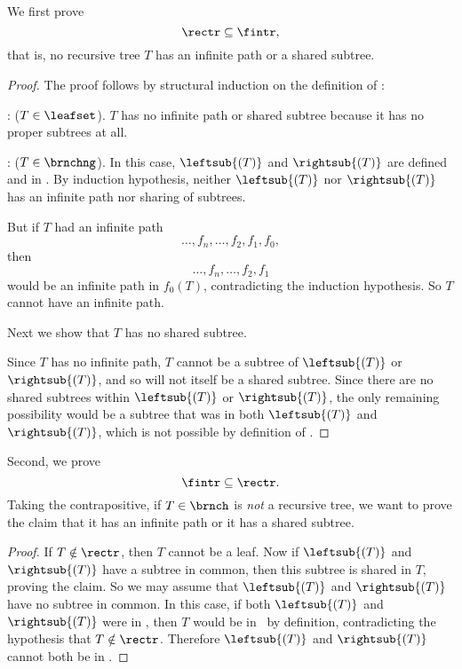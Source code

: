 \begin{definition}
We first prove
\begin{equation}\label{rectrsubfintr}
\rectr \subseteq \fintr,
\end{equation}
that is, no recursive tree $T$ has an infinite path or a shared subtree.

\begin{proof}
The proof follows by structural induction on the
definition of \rectr:

: ($T \in \leafset$).  $T$ has no infinite path
or shared subtree because it has no proper subtrees at all.

: ($T \in \brnchng$).  In this case,
$\leftsub{(T)}$ and $\rightsub{(T)}$ are defined and in \rectr.  By
induction hypothesis, neither $\leftsub{(T)}$ nor $\rightsub{(T)}$ has an
infinite path nor sharing of subtrees.

But if $T$ had an infinite path
\[
\dots,f_n,\dots, f_2,f_1,f_0,
\]
then
\begin{equation}\label{dfnf2f1}
\dots,f_n,\dots,f_2,f_1
\end{equation}
would be an infinite path in $f_0(T)$, contradicting the induction
hypothesis.  So $T$ cannot have an infinite path.

Next we show that $T$ has no shared subtree.

Since $T$ has no infinite path, $T$ cannot be a subtree of
$\leftsub{(T)}$ or $\rightsub{(T)}$, and so will not itself be a
shared subtree.  Since there are no shared subtrees within
$\leftsub{(T)}$ or $\rightsub{(T)}$, the only remaining possibility
would be a subtree that was in both $\leftsub{(T)}$ and
$\rightsub{(T)}$, which is not possible by definition of \rectr.
\end{proof}

Second, we prove
\begin{equation}\label{fintrsubrectr}
\fintr \subseteq \rectr.
\end{equation}
Taking the contrapositive, if $T \in \brnch$ is \emph{not} a recursive
tree, we want to prove the claim that it has an infinite path or it
has a shared subtree.

\begin{proof}
If $T \notin \rectr$, then $T$ cannot be a leaf.  Now if
$\leftsub{(T)}$ and $\rightsub{(T)}$ have a subtree in common, then
this subtree is shared in $T$, proving the claim.  So we may assume
that $\leftsub{(T)}$ and $\rightsub{(T)}$ have no subtree in common.
In this case, if both $\leftsub{(T)}$ and $\rightsub{(T)}$ were in
\rectr, then $T$ would be in \rectr\ by definition, contradicting the
hypothesis that $T \notin \rectr$.  Therefore $\leftsub{(T)}$ and
$\rightsub{(T)}$ cannot both be in \rectr.


\end{proof}
\end{definition}
